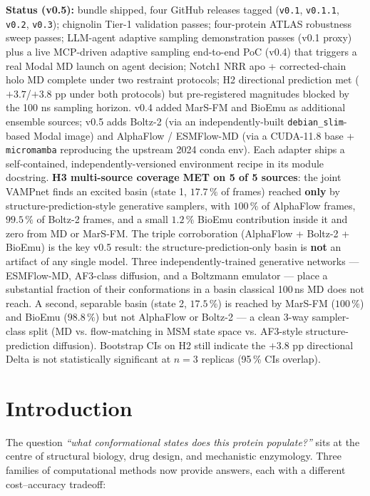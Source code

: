 \documentclass[11pt]{article}
\begin{document}
\vspace{1em}
\noindent\textbf{Status (v0.5):} bundle shipped, four GitHub releases
tagged (\texttt{v0.1}, \texttt{v0.1.1}, \texttt{v0.2}, \texttt{v0.3});
chignolin Tier-1 validation passes; four-protein ATLAS robustness sweep
passes; LLM-agent adaptive sampling demonstration passes (v0.1 proxy)
plus a live MCP-driven adaptive sampling end-to-end PoC (v0.4) that
triggers a real Modal MD launch on agent decision; Notch1 NRR apo +
corrected-chain holo MD complete under two restraint protocols; H2
directional prediction met ($+3.7$/$+3.8$ pp under both protocols)
but pre-registered magnitudes blocked by the 100 ns sampling horizon.
v0.4 added MarS-FM and BioEmu as additional ensemble sources;
v0.5 adds Boltz-2 (via an independently-built \texttt{debian\_slim}-based
Modal image) and AlphaFlow / ESMFlow-MD (via a CUDA-11.8 base +
\texttt{micromamba} reproducing the upstream 2024 conda env). Each
adapter ships a self-contained, independently-versioned environment
recipe in its module docstring.
\textbf{H3 multi-source coverage MET on 5 of 5 sources}: the joint
VAMPnet finds an excited basin (state 1, $17.7\,\%$ of frames)
reached \textbf{only} by structure-prediction-style generative
samplers, with $100\,\%$ of AlphaFlow frames, $99.5\,\%$ of Boltz-2
frames, and a small $1.2\,\%$ BioEmu contribution inside it and
zero from MD or MarS-FM. The triple corroboration (AlphaFlow + Boltz-2
+ BioEmu) is the key v0.5 result: the structure-prediction-only
basin is \textbf{not} an artifact of any single model. Three
independently-trained generative networks --- ESMFlow-MD, AF3-class
diffusion, and a Boltzmann emulator --- place a substantial fraction
of their conformations in a basin classical 100\,ns MD does not
reach. A second, separable basin (state 2, $17.5\,\%$) is reached
by MarS-FM ($100\,\%$) and BioEmu ($98.8\,\%$) but not AlphaFlow or
Boltz-2 --- a clean 3-way sampler-class split (MD vs. flow-matching
in MSM state space vs. AF3-style structure-prediction diffusion).
Bootstrap CIs on H2 still indicate the $+3.8$ pp directional Delta
is not statistically significant at $n = 3$ replicas (95\,\% CIs
overlap).

\section{Introduction}

The question \emph{``what conformational states does this protein
populate?''} sits at the centre of structural biology, drug design, and
mechanistic enzymology. Three families of computational methods now
provide answers, each with a different cost--accuracy tradeoff:
\end{document}
